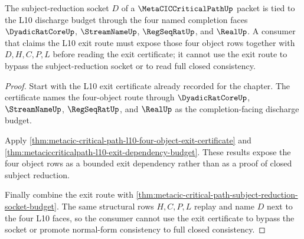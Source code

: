 \begin{theorem}
\label{thm:metacic-critical-path-l10-discharge-budget}
The subject-reduction socket $D$ of a $\MetaCICCriticalPathUp$ packet is tied to the L10 discharge budget through the four named completion faces $\DyadicRatCoreUp$, $\StreamNameUp$, $\RegSeqRatUp$, and $\RealUp$. A consumer that claims the L10 exit route must expose those four object rows together with $D,H,C,P,L$ before reading the exit certificate; it cannot use the exit route to bypass the subject-reduction socket or to read full closed consistency.
\end{theorem}
\begin{proof}
Start with the L10 exit certificate already recorded for the chapter. The certificate names the four-object route through $\DyadicRatCoreUp$, $\StreamNameUp$, $\RegSeqRatUp$, and $\RealUp$ as the completion-facing discharge budget.

Apply \autoref{thm:metacic-critical-path-l10-four-object-exit-certificate} and \autoref{thm:metaciccriticalpath-l10-exit-dependency-budget}. These results expose the four object rows as a bounded exit dependency rather than as a proof of closed subject reduction.

Finally combine the exit route with \autoref{thm:metacic-critical-path-subject-reduction-socket-budget}. The same structural rows $H,C,P,L$ replay and name $D$ next to the four L10 faces, so the consumer cannot use the exit certificate to bypass the socket or promote normal-form consistency to full closed consistency.
\end{proof}

